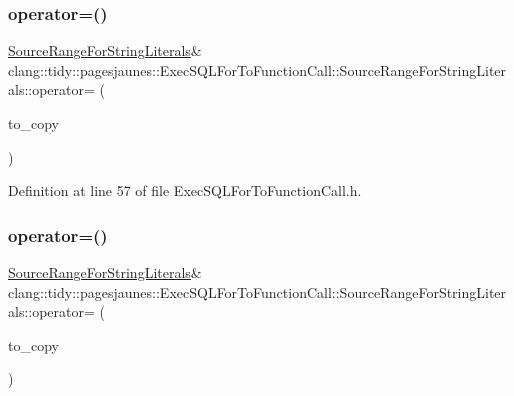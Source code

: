 \subsubsection{\texorpdfstring{operator=()}{operator=()}\hspace{0.1cm}{\footnotesize\ttfamily [1/2]}}
{\footnotesize\ttfamily \hyperlink{classclang_1_1tidy_1_1pagesjaunes_1_1_exec_s_q_l_for_to_function_call_1_1_source_range_for_string_literals}{Source\+Range\+For\+String\+Literals}\& clang\+::tidy\+::pagesjaunes\+::\+Exec\+S\+Q\+L\+For\+To\+Function\+Call\+::\+Source\+Range\+For\+String\+Literals\+::operator= (\begin{DoxyParamCaption}\item[{const \hyperlink{classclang_1_1tidy_1_1pagesjaunes_1_1_exec_s_q_l_for_to_function_call_1_1_source_range_for_string_literals}{Source\+Range\+For\+String\+Literals} \&}]{to\+\_\+copy }\end{DoxyParamCaption})\hspace{0.3cm}{\ttfamily [inline]}}



Definition at line 57 of file Exec\+S\+Q\+L\+For\+To\+Function\+Call.\+h.

\mbox{\label{classclang_1_1tidy_1_1pagesjaunes_1_1_exec_s_q_l_for_to_function_call_1_1_source_range_for_string_literals_ab5ae08d2dad5e22f5666ac30aa1bf233}} 
\subsubsection{\texorpdfstring{operator=()}{operator=()}\hspace{0.1cm}{\footnotesize\ttfamily [2/2]}}
{\footnotesize\ttfamily \hyperlink{classclang_1_1tidy_1_1pagesjaunes_1_1_exec_s_q_l_for_to_function_call_1_1_source_range_for_string_literals}{Source\+Range\+For\+String\+Literals}\& clang\+::tidy\+::pagesjaunes\+::\+Exec\+S\+Q\+L\+For\+To\+Function\+Call\+::\+Source\+Range\+For\+String\+Literals\+::operator= (\begin{DoxyParamCaption}\item[{\hyperlink{classclang_1_1tidy_1_1pagesjaunes_1_1_exec_s_q_l_for_to_function_call_1_1_source_range_for_string_literals}{Source\+Range\+For\+String\+Literals} \&}]{to\+\_\+copy }\end{DoxyParamCaption})\hspace{0.3cm}{\ttfamily [inline]}}



